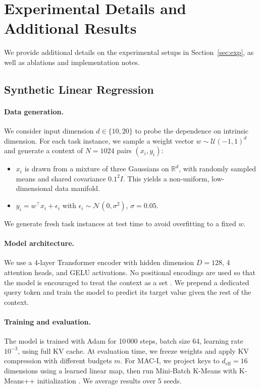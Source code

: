 \documentclass{article}
\theoremstyle{plain}
\theoremstyle{definition}
\theoremstyle{remark}
\begin{document}
\section{Experimental Details and Additional Results}
\label{app:exp_details}

We provide additional details on the experimental setups in Section~\ref{sec:exp}, as
well as ablations and implementation notes.

\subsection{Synthetic Linear Regression}
\label{app:exp_synth_details}

\paragraph{Data generation.}
We consider input dimension $d\in\{10,20\}$ to probe the dependence on intrinsic
dimension. For each task instance, we sample a weight vector $w\sim\mathcal{U}(-1,1)^d$
and generate a context of $N=1024$ pairs $(x_i,y_i)$:
\begin{itemize}[leftmargin=*,noitemsep,topsep=1pt]
    \item $x_i$ is drawn from a mixture of three Gaussians on $\mathbb{R}^d$, with
    randomly sampled means and shared covariance $0.1^2 I$. This yields a non-uniform,
    low-dimensional data manifold.
    \item $y_i = w^\top x_i + \epsilon_i$ with
    $\epsilon_i \sim \mathcal{N}(0,\sigma^2)$, $\sigma=0.05$.
\end{itemize}
We generate fresh task instances at test time to avoid overfitting to a fixed $w$.

\paragraph{Model architecture.}
We use a 4-layer Transformer encoder with hidden dimension $D=128$, 4 attention heads,
and GELU activations. No positional encodings are used so that the model is encouraged
to treat the context as a set \citep{lee2019set}. We prepend a dedicated query token and
train the model to predict its target value given the rest of the context.

\paragraph{Training and evaluation.}
The model is trained with Adam for 10\,000 steps, batch size 64, learning rate $10^{-3}$,
using full KV cache. At evaluation time, we freeze weights and apply KV compression with
different budgets $m$. For MAC-I, we project keys to $d_{\text{eff}}=16$ dimensions using
a learned linear map, then run Mini-Batch K-Means with K-Means++ initialization
\citep{arthur2007k}. We average results over 5 seeds.
\end{document}
